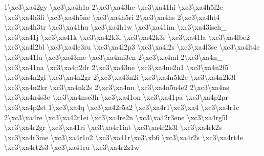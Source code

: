 {1\textbackslash{}xc3\textbackslash{}xa42gy \textbackslash{}xc3\textbackslash{}xa4h1a 2\textbackslash{}xc3\textbackslash{}xa43he \textbackslash{}xc3\textbackslash{}xa41hi \textbackslash{}xc3\textbackslash{}xa4h5l2e \textbackslash{}xc3\textbackslash{}xa4h3li \textbackslash{}xc3\textbackslash{}xa4h5ne \textbackslash{}xc3\textbackslash{}xa4h5ri 2\textbackslash{}xc3\textbackslash{}xa4hs 2\textbackslash{}xc3\textbackslash{}xa4ht4 \textbackslash{}xc3\textbackslash{}xa4h3tr \textbackslash{}xc3\textbackslash{}xa41hu \textbackslash{}xc3\textbackslash{}xa4h1w \textbackslash{}xc3\textbackslash{}xa41im \textbackslash{}xc3\textbackslash{}xa43isch\-\_\- \textbackslash{}xc3\textbackslash{}xa41j \textbackslash{}xc3\textbackslash{}xa41k \textbackslash{}xc3\textbackslash{}xa42k3l \textbackslash{}xc3\textbackslash{}xa42k3r \textbackslash{}xc3\textbackslash{}xa41la \textbackslash{}xc3\textbackslash{}xa4lbe2 \textbackslash{}xc3\textbackslash{}xa4l2bl \textbackslash{}xc3\textbackslash{}xa4le3ru \textbackslash{}xc3\textbackslash{}xa4l2p3 \textbackslash{}xc3\textbackslash{}xa4l2s \textbackslash{}xc3\textbackslash{}xa4l3se \textbackslash{}xc3\textbackslash{}xa4lt4e \textbackslash{}xc3\textbackslash{}xa41lu \textbackslash{}xc3\textbackslash{}xa43me \textbackslash{}xc3\textbackslash{}xa4mi3en 2\textbackslash{}xc3\textbackslash{}xa4ml 2\textbackslash{}xc3\textbackslash{}xa4n\-\_\- \textbackslash{}xc3\textbackslash{}xa41na \textbackslash{}xc3\textbackslash{}xa4n2dr 2\textbackslash{}xc3\textbackslash{}xa43ne \textbackslash{}xc3\textbackslash{}xa4ne2n1 \textbackslash{}xc3\textbackslash{}xa4n2f5 \textbackslash{}xc3\textbackslash{}xa4n2gl \textbackslash{}xc3\textbackslash{}xa4n2gr 2\textbackslash{}xc3\textbackslash{}xa43n2i \textbackslash{}xc3\textbackslash{}xa4n5k2e \textbackslash{}xc3\textbackslash{}xa4n2k3l \textbackslash{}xc3\textbackslash{}xa4n2kr \textbackslash{}xc3\textbackslash{}xa4nk2s 2\textbackslash{}xc3\textbackslash{}xa4nn \textbackslash{}xc3\textbackslash{}xa4n5n4e2 2\textbackslash{}xc3\textbackslash{}xa4ns \textbackslash{}xc3\textbackslash{}xa4n4s3c \textbackslash{}xc3\textbackslash{}xa4nse3h \textbackslash{}xc3\textbackslash{}xa41on \textbackslash{}xc3\textbackslash{}xa41pa \textbackslash{}xc3\textbackslash{}xa4p2pr \textbackslash{}xc3\textbackslash{}xa4p2st 1\textbackslash{}xc3\textbackslash{}xa4q \textbackslash{}xc3\textbackslash{}xa42r5a2 \textbackslash{}xc3\textbackslash{}xa4r1\textbackslash{}xc3\textbackslash{}xa4 \textbackslash{}xc3\textbackslash{}xa4r1c 2\textbackslash{}xc3\textbackslash{}xa4re \textbackslash{}xc3\textbackslash{}xa42r1ei \textbackslash{}xc3\textbackslash{}xa4re2n \textbackslash{}xc3\textbackslash{}xa42r3ene \textbackslash{}xc3\textbackslash{}xa4rg5l \textbackslash{}xc3\textbackslash{}xa4r2gr \textbackslash{}xc3\textbackslash{}xa41ri \textbackslash{}xc3\textbackslash{}xa4r1int \textbackslash{}xc3\textbackslash{}xa4r2k3l \textbackslash{}xc3\textbackslash{}xa4rk2s \textbackslash{}xc3\textbackslash{}xa4r3me \textbackslash{}xc3\textbackslash{}xa4r1o2 \textbackslash{}xc3\textbackslash{}xa41r\textbackslash{}xc3\textbackslash{}xb6 \textbackslash{}xc3\textbackslash{}xa4r2s \textbackslash{}xc3\textbackslash{}xa4rt4e \textbackslash{}xc3\textbackslash{}xa4rt2s3 \textbackslash{}xc3\textbackslash{}xa41ru \textbackslash{}xc3\textbackslash{}xa4r2z1w }
